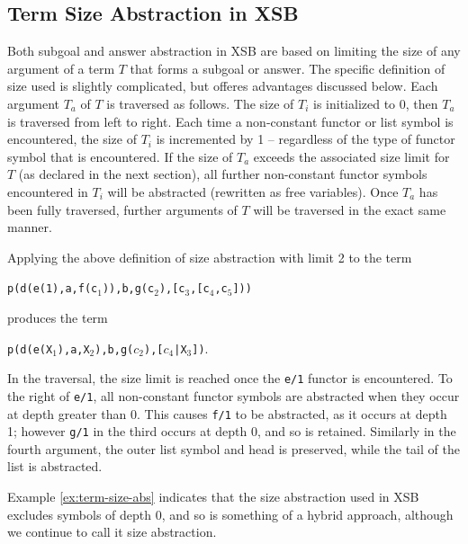 \subsection{Term Size Abstraction in XSB} \label{sec:size-metric}
%
Both subgoal and answer abstraction in XSB are based on limiting the
size of any argument of a term $T$ that forms a subgoal or answer.
The specific definition of size used is slightly complicated, but
offeres advantages discussed below.  Each argument $T_a$ of $T$ is
traversed as follows.  The size of $T_i$ is initialized to 0, then
$T_a$ is traversed from left to right.  Each time a non-constant
functor or list symbol is encountered, the size of $T_i$ is
incremented by 1 -- regardless of the type of functor symbol that is
encountered.  If the size of $T_a$ exceeds the associated size limit
for $T$ (as declared in the next section), all further non-constant
functor symbols encountered in $T_i$ will be abstracted (rewritten as
free variables).  Once $T_a$ has been fully traversed, further
arguments of $T$ will be traversed in the exact same manner.


\begin{example} \label{ex:term-size-abs}
Applying the above definition of size abstraction with limit 2 to the
term 

{\tt p(d(e(1),a,f(c$_1$)),b,g(c$_2$),[c$_3$,[c$_4$,c$_5$]))}

\noindent
  produces the term 

{\tt p(d(e(X$_1$),a,X$_2$),b,g($c_2$),[$c_4$|X$_3$])}.  

\noindent
In the traversal, the size limit is reached once the {\tt e/1} functor
is encountered.  To the right of {\tt e/1}, all non-constant functor
symbols are abstracted when they occur at depth greater than 0.  This
causes {\tt f/1} to be abstracted, as it occurs at depth 1; however
{\tt g/1} in the third occurs at depth 0, and so is retained.
Similarly in the fourth argument, the outer list symbol and head is
preserved, while the tail of the list is abstracted.
\end{example}

Example \ref{ex:term-size-abs} indicates that the size abstraction
used in XSB excludes symbols of depth 0, and so is something of a
hybrid approach, although we continue to call it size abstraction.

